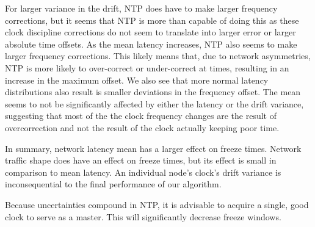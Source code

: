 For larger variance in the drift, NTP does have to make larger
frequency corrections, but it seems that NTP is more than capable of
doing this as these clock discipline corrections do not seem to
translate into larger error or larger absolute time offsets. As the
mean latency increases, NTP also seems to make larger frequency
corrections. This likely means that, due to network asymmetries, NTP
is more likely to over-correct or under-correct at times, resulting in
an increase in the maximum offset. We also see that more normal
latency distributions also result is smaller deviations in the
frequency offset. The mean seems to not be significantly affected by
either the latency or the drift variance, suggesting that most of the
the clock frequency changes are the result of overcorrection and not
the result of the clock actually keeping poor time.

In summary, network latency mean has a larger effect on freeze
times. Network traffic shape does have an effect on freeze times, but
its effect is small in comparison to mean latency. An individual
node's clock's drift variance is inconsequential to the final
performance of our algorithm.

Because uncertainties compound in NTP, it is advisable to
acquire a single, good clock to serve as a master. This will
significantly decrease freeze windows.

